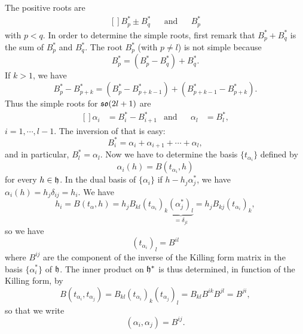 The positive roots are
\begin{equation}
	\begin{aligned}[]
		B_p^*\pm B_q^*	&&	\text{and}	&& B_p^*
	\end{aligned}
\end{equation}
with $p<q$. In order to determine the simple roots, first remark that $B_p^*+B_q^*$ is the sum of $B_p^*$ and $B_q^*$. The root $B_p^*$ (with $p\neq l$) is not simple because
\begin{equation}
	B^*_p=(B^*_p-B^*_q)+B^*_q.
\end{equation}
If $k>1$, we have
\begin{equation}
	B_p^*-B^*_{p+k} = (B_p^*-B^*_{p+k-1} )+(B_{p+k-1}^*-B^*_{p+k} ).
\end{equation}
Thus the simple roots for $\operatorname{\mathfrak{so}}(2l+1)$ are
\begin{equation}			\label{EqRacinesSimplessol}
	\begin{aligned}[]
		\alpha_i &=B^*_i-B^*_{i+1}	&	\text{and}	&&	\alpha_l &=B^*_l,
	\end{aligned}
\end{equation}
$i=1,\cdots,l-1$. The inversion of that is easy: 
\begin{equation}		\label{EqsonBenFnDesAlpha}
	B^*_i=\alpha_i+\alpha_{i+1}+\cdots+\alpha_l,
\end{equation}
and in particular, $B^*_l=\alpha_l$. Now we have to determine the basis $\{ t_{\alpha_i}\}$ defined by
\begin{equation}
	\alpha_i(h)=B(t_{\alpha_i},h)
\end{equation}
for every $h\in\mathfrak{h}$. In the dual basis of $\{\alpha_i\}$ if $h-h_j\alpha_j^*$, we have $\alpha_i(h)=h_j\delta_{ij}=h_i$. We have
\begin{equation}
	h_i=B(t_{\alpha},h)=h_jB_{kl}(t_{\alpha_i})_k\underbrace{(\alpha_j^*)_l}_{=\delta_{jl}}=h_jB_{kj}(t_{\alpha_i})_k,
\end{equation}
so we have
\begin{equation}
	(t_{\alpha_i})_l=B^{il}
\end{equation}
where $B^{ij}$ are the component of the inverse of the Killing form matrix in the basis $\{ \alpha_i^* \}$ of $\mathfrak{h}$. The inner product on $\mathfrak{h}^*$ is thus determined, in function of the Killing form, by
\begin{equation}
	B(t_{\alpha_i},t_{\alpha_j})=B_{kl}(t_{\alpha_i})_k(t_{\alpha_j})_l=B_{kl}B^{ik}B^{jl}=B^{ji},
\end{equation}
so that we write
\begin{equation}
	(\alpha_i,\alpha_j)=B^{ij}.
\end{equation}

